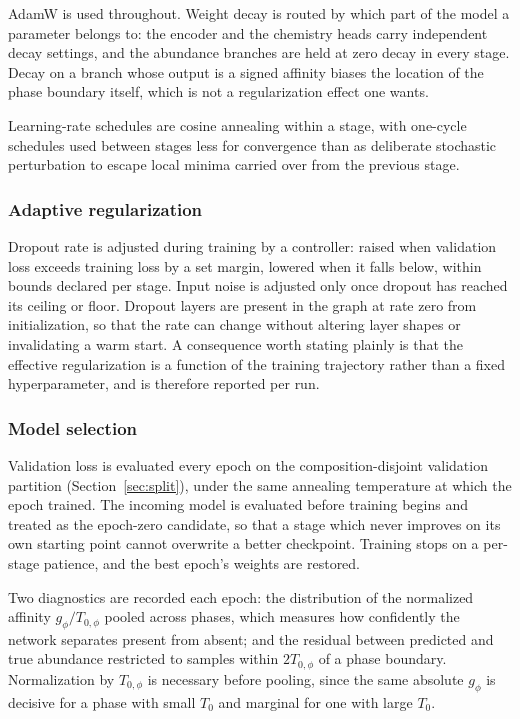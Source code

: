AdamW is used throughout. Weight decay is routed by which part of the model a
parameter belongs to: the encoder and the chemistry heads carry independent decay
settings, and the abundance branches are held at zero decay in every stage. Decay on
a branch whose output is a signed affinity biases the location of the phase boundary
itself, which is not a regularization effect one wants.

Learning-rate schedules are cosine annealing within a stage, with one-cycle schedules
used between stages less for convergence than as deliberate stochastic perturbation
to escape local minima carried over from the previous stage.

\subsubsection{Adaptive regularization}

Dropout rate is adjusted during training by a controller: raised when validation loss
exceeds training loss by a set margin, lowered when it falls below, within bounds
declared per stage. Input noise is adjusted only once dropout has reached its ceiling
or floor. Dropout layers are present in the graph at rate zero from initialization, so
that the rate can change without altering layer shapes or invalidating a warm start.
A consequence worth stating plainly is that the effective regularization is a function
of the training trajectory rather than a fixed hyperparameter, and is therefore
reported per run.

\subsubsection{Model selection}

Validation loss is evaluated every epoch on the composition-disjoint validation
partition (Section~\ref{sec:split}), under the same annealing temperature at which the
epoch trained. The incoming model is evaluated before training begins and treated as
the epoch-zero candidate, so that a stage which never improves on its own starting
point cannot overwrite a better checkpoint. Training stops on a per-stage patience,
and the best epoch's weights are restored.

Two diagnostics are recorded each epoch: the distribution of the normalized affinity
$g_\phi/T_{0,\phi}$ pooled across phases, which measures how confidently the network
separates present from absent; and the residual between predicted and true abundance
restricted to samples within $2T_{0,\phi}$ of a phase boundary. Normalization by
$T_{0,\phi}$ is necessary before pooling, since the same absolute $g_\phi$ is
decisive for a phase with small $T_0$ and marginal for one with large $T_0$.


